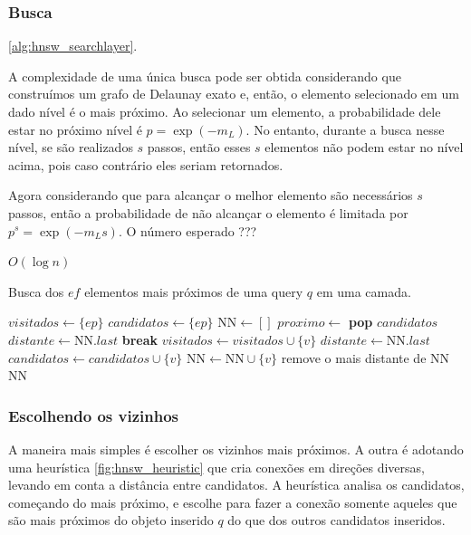 \subsubsection{Busca}

\cref{alg:hnsw_searchlayer}.

A complexidade de uma única busca pode ser obtida considerando que construímos um grafo de Delaunay exato e, então, o elemento selecionado em um dado nível é o mais próximo. Ao selecionar um elemento, a probabilidade dele estar no próximo nível é $p = \exp(-m_L)$. No entanto, durante a busca nesse nível, se são realizados $s$ passos, então esses $s$ elementos não podem estar no nível acima, pois caso contrário eles seriam retornados.

Agora considerando que para alcançar o melhor elemento são necessários $s$ passos, então a probabilidade de não alcançar o elemento é limitada por $p^s = \exp(-m_Ls)$. O número esperado ???

$O(\log n)$

\begin{algorithm}
\caption{Busca dos $ef$ elementos mais próximos de uma query $q$ em uma camada.}
\label{alg:hnsw_searchlayer}
\begin{algorithmic}[1]
\State $visitados \gets \{ep\}$
\State $candidatos \gets \{ep\}$
\State $\text{NN} \gets []$
\State $proximo \gets$ \textbf{pop} $candidatos$
\State $distante \gets \text{NN}.last$
\State \textbf{break}
\EndIf
{}
\State $visitados \gets visitados \cup \{v\}$
\State $distante \gets \text{NN}.last$
\State $candidatos \gets candidatos \cup \{v\}$
\State $\text{NN} \gets \text{NN} \cup \{v\}$
\State remove o mais distante de $\text{NN}$
\EndIf
\EndIf
\EndIf
\EndFor
\EndWhile
\State \Return $\text{NN}$
\EndProcedure
\end{algorithmic}
\end{algorithm}

\subsubsection{Escolhendo os vizinhos}

A maneira mais simples é escolher os vizinhos mais próximos. A outra é adotando uma heurística \cref{fig:hnsw_heuristic} que cria conexões em direções diversas, levando em conta a distância entre candidatos.
A heurística analisa os candidatos, começando do mais próximo, e escolhe para fazer a conexão somente aqueles que são mais próximos do objeto inserido $q$ do que dos outros candidatos inseridos.


